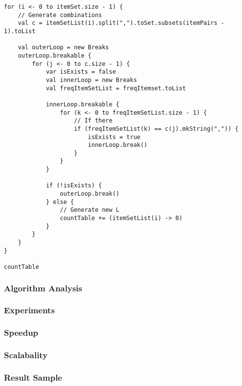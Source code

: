 \documentclass[11pt]{article}
\begin{document}
\begin{lstlisting}
for (i <- 0 to itemSet.size - 1) {
    // Generate combinations
    val c = itemSetList(i).split(",").toSet.subsets(itemPairs - 1).toList

    val outerLoop = new Breaks
    outerLoop.breakable {
        for (j <- 0 to c.size - 1) {
            var isExists = false
            val innerLoop = new Breaks
            val freqItemSetList = freqItemset.toList

            innerLoop.breakable {
                for (k <- 0 to freqItemSetList.size - 1) {
                    // If there
                    if (freqItemSetList(k) == c(j).mkString(",")) {
                        isExists = true
                        innerLoop.break()
                    }
                }
            }

            if (!isExists) {
                outerLoop.break()
            } else {
                // Generate new L
                countTable += (itemSetList(i) -> 0)
            }
        }
    }
}

countTable
\end{lstlisting}


\subsubsection {Algorithm Analysis}
\subsubsection {Experiments}
\subsubsection {Speedup}
\subsubsection {Scalabality}
\subsubsection {Result Sample}
 
\end{document}
